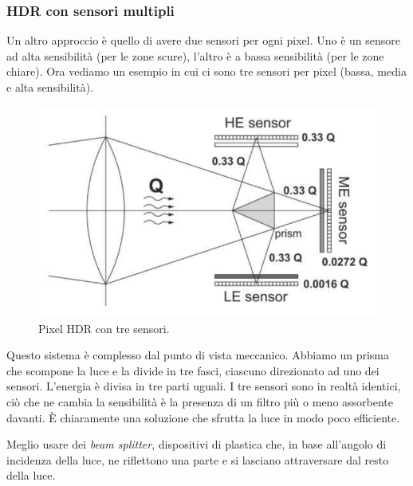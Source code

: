 \documentclass[a4paper,11pt]{article}
\begin{document}
\subsubsection{HDR con sensori multipli}
Un altro approccio è quello di avere due sensori per ogni pixel. Uno è un sensore ad alta sensibilità (per le zone scure),
l'altro è a bassa sensibilità (per le zone chiare). Ora vediamo un esempio in cui ci sono tre sensori per pixel (bassa, media e alta sensibilità).

\renewcommand{\thefigure}{3.15}
\begin{figure}[!h]
  \centering
    \includegraphics[scale=0.4]{images/3/trisensor_naive.png}
    \caption{Pixel HDR con tre sensori.}
\end{figure}

Questo sistema è complesso dal punto di vista meccanico. Abbiamo un prisma che scompone la luce e la divide in tre fasci,
ciascuno direzionato ad uno dei sensori. L'energia è divisa in  tre parti uguali.
I tre sensori sono in realtà identici, ciò che ne cambia la sensibilità è la presenza di un filtro più o meno assorbente
davanti. È chiaramente una soluzione che sfrutta la luce in modo poco efficiente.
\par
Meglio usare dei \textit{beam splitter}, dispositivi di plastica che, in base all'angolo di incidenza della luce, ne riflettono una parte e si lasciano attraversare dal resto della luce.
\end{document}
